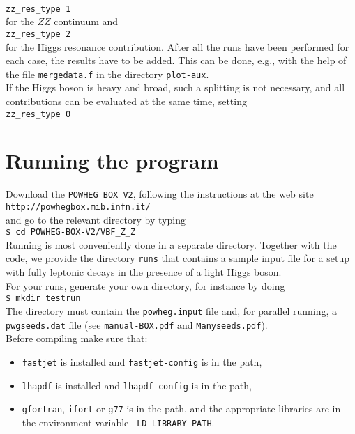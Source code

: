 \documentclass[a4paper,11pt]{article}
\begin{document}
\\[2ex]
{\tt zz\_res\_type 1}
\\[2ex]
for the $ZZ$ continuum and
\\[2ex]
{\tt zz\_res\_type 2}
\\[2ex]
for the Higgs resonance contribution. After all the runs have been
performed for each case, the results have to be added. This can be
done, e.g., with the help of the file {\tt mergedata.f} in the
directory {\tt plot-aux}. 
\\[2ex]
If the Higgs boson is heavy and broad, such a splitting is not necessary,
and all contributions can be evaluated at the same time, setting
\\[2ex]
{\tt zz\_res\_type 0}
\\[2ex]
%

\section*{Running the program}
%
Download the {\tt POWHEG BOX V2}, following the instructions at the web site 
\\[2ex]
{\tt http://powhegbox.mib.infn.it/}
\\[2ex] 
and go to the relevant directory by typing 
\\[2ex]
{\tt \$ cd POWHEG-BOX-V2/VBF\_Z\_Z}  
\\[2ex]
Running is most conveniently done in a separate directory. Together with the code, we provide the directory {\tt runs} that contains a sample input file for a setup with fully leptonic decays in the presence of a light Higgs boson. 
\\[2ex]
For your runs, generate your own directory, for instance by doing 
\\[2ex]
{\tt \$ mkdir testrun}
\\[2ex]
The directory must contain the {\tt powheg.input} file and, for
parallel running, a {\tt pwgseeds.dat} file (see {\tt manual-BOX.pdf}
and {\tt Manyseeds.pdf}).
\\[2ex]
Before compiling make sure that:
\begin{itemize}
\item 
{\tt fastjet} is installed and {\tt fastjet-config} is in the path,
\item 
{\tt lhapdf} is installed and {\tt lhapdf-config} is in the path,
\item
{\tt gfortran}, {\tt ifort} or {\tt g77} is in the path, and the
appropriate libraries are in the environment variable {\tt
  LD\_LIBRARY\_PATH}. 
\end{itemize}
\end{document}

